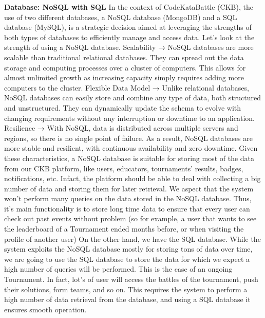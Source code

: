 \textbf{Database: NoSQL with SQL}\newline
In the context of CodeKataBattle (CKB), the use of two different databases, a NoSQL database (MongoDB) and a SQL database (MySQL), 
is a strategic decision aimed at leveraging the strengths of both types of databases to efficiently manage and access data.\newline
Let’s look at the strength of using a NoSQL database.\newline
Scalability → NoSQL databases are more scalable than traditional relational databases. 
They can spread out the data storage and computing processes over a cluster of computers. 
This allows for almost unlimited growth as increasing capacity simply requires adding more computers to the cluster.\newline
Flexible Data Model → Unlike relational databases, NoSQL databases can easily store and combine any type of data, both structured and unstructured. 
They can dynamically update the schema to evolve with changing requirements without any interruption or downtime to an application.\newline
Resilience → With NoSQL, data is distributed across multiple servers and regions, so there is no single point of failure. 
As a result, NoSQL databases are more stable and resilient, with continuous availability and zero downtime.\newline
Given these characteristics, a NoSQL database is suitable for storing most of the data from our CKB platform, like users, 
educators, tournaments’ results, badges, notifications, etc. Infact, the platform should be able to deal with collecting a 
big number of data and storing them for later retrieval. We aspect that the system won’t perform many queries on the data stored in the NoSQL database. 
Thus, it’s main functionality is to store long time data to ensure that every user can check out past events without problem 
(so for example, a user that wants to see the leaderboard of a Tournament ended months before, or when visiting the profile of another user)\newline
On the other hand, we have the SQL database. While the system exploits the NoSQL database mostly for storing tons of data over time, 
we are going to use the SQL database to store the data for which we expect a high number of queries will be performed. This is the case of an ongoing Tournament. 
In fact, lot’s of user will access the battles of the tournament, push their solutions, form teams, and so on. 
This requires the system to perform a high number of data retrieval from the database, and using a SQL database it ensures smooth operation. 
